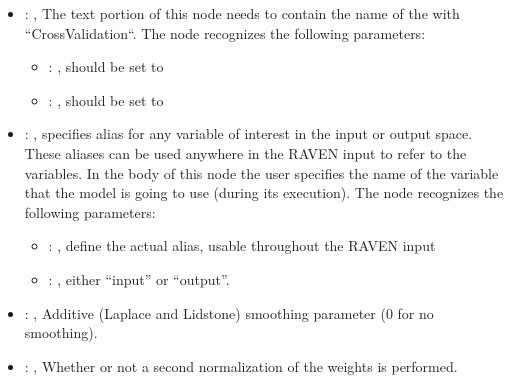 \begin{itemize}
\begin{itemize}
        \item {}: ,
          List of IDs of features/variables to include in the transformation process.

        \item {}: ,
          Which space to search? Target or Feature?
      \end{itemize}

    \item {}: ,
      The text portion of this node needs to contain the name of the  with
               ``CrossValidation``.
      The  node recognizes the following parameters:
        \begin{itemize}
          \item {}: ,
            should be set to 
          \item {}: ,
            should be set to 
      \end{itemize}

    \item {}: ,
      specifies alias for         any variable of interest in the input or output space. These
      aliases can be used anywhere in the RAVEN input to         refer to the variables. In the body
      of this node the user specifies the name of the variable that the model is going to use
      (during its execution).
      The  node recognizes the following parameters:
        \begin{itemize}
          \item {}: ,
            define the actual alias, usable throughout the RAVEN input
          \item {}: ,
            either ``input'' or ``output''.
      \end{itemize}

    \item {}: ,
      Additive (Laplace and Lidstone) smoothing parameter (0 for no smoothing).

    \item {}: ,
      Whether or not a second normalization of the weights is performed.


\end{itemize}
